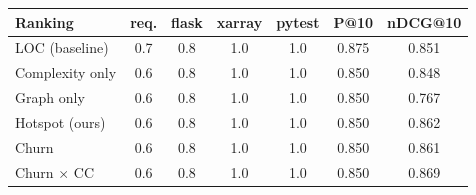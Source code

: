 \begin{tabular}{lcccccc}
\toprule
Ranking & req. & flask & xarray & pytest & P@10 & nDCG@10 \\
\midrule
LOC (baseline) & 0.7 & 0.8 & 1.0 & 1.0 & 0.875 & 0.851 \\
Complexity only & 0.6 & 0.8 & 1.0 & 1.0 & 0.850 & 0.848 \\
Graph only & 0.6 & 0.8 & 1.0 & 1.0 & 0.850 & 0.767 \\
Hotspot (ours) & 0.6 & 0.8 & 1.0 & 1.0 & 0.850 & 0.862 \\
Churn & 0.6 & 0.8 & 1.0 & 1.0 & 0.850 & 0.861 \\
Churn $\times$ CC & 0.6 & 0.8 & 1.0 & 1.0 & 0.850 & 0.869 \\
\bottomrule
\end{tabular}
